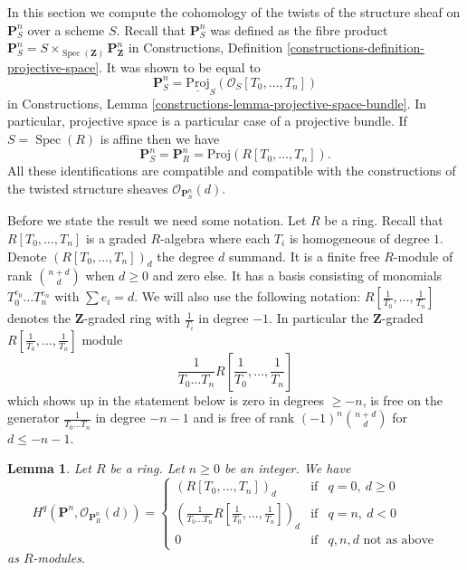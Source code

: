 \documentclass{stacks-project}
\newenvironment{reference}{\comment}{\endcomment}
\theoremstyle{plain}
\newtheorem{lemma}[subsection]{Lemma}
\theoremstyle{definition}
\theoremstyle{remark}
\numberwithin{equation}{subsection}
\def\Spec{\mathop{\mathrm{Spec}}}
\begin{document}
\noindent
In this section we compute the cohomology of the twists of the
structure sheaf on $\mathbf{P}^n_S$ over a scheme $S$.
Recall that $\mathbf{P}^n_S$ was defined as the fibre product
$
\mathbf{P}^n_S = S \times_{\Spec(\mathbf{Z})} \mathbf{P}^n_{\mathbf{Z}}
$
in Constructions, Definition \ref{constructions-definition-projective-space}.
It was shown to be equal to
$$
\mathbf{P}^n_S = \underline{\text{Proj}}_S(\mathcal{O}_S[T_0, \ldots, T_n])
$$
in Constructions, Lemma \ref{constructions-lemma-projective-space-bundle}.
In particular, projective space is a particular case of a projective bundle.
If $S = \Spec(R)$ is affine then we have
$$
\mathbf{P}^n_S = \mathbf{P}^n_R = \text{Proj}(R[T_0, \ldots, T_n]).
$$
All these identifications are compatible and compatible with the constructions
of the twisted structure sheaves $\mathcal{O}_{\mathbf{P}^n_S}(d)$.

\medskip\noindent
Before we state the result we need some notation.
Let $R$ be a ring.
Recall that $R[T_0, \ldots, T_n]$ is a graded
$R$-algebra where each $T_i$ is homogeneous of degree $1$.
Denote $(R[T_0, \ldots, T_n])_d$ the degree $d$ summand.
It is a finite free $R$-module of rank $\binom{n + d}{d}$
when $d \geq 0$ and zero else.
It has a basis consisting of monomials $T_0^{e_0} \ldots T_n^{e_n}$
with $\sum e_i = d$. We will also use the following notation:
$R[\frac{1}{T_0}, \ldots, \frac{1}{T_n}]$ denotes the $\mathbf{Z}$-graded
ring with $\frac{1}{T_i}$ in degree $-1$. In particular the
$\mathbf{Z}$-graded $R[\frac{1}{T_0}, \ldots, \frac{1}{T_n}]$ module
$$
\frac{1}{T_0 \ldots T_n} R[\frac{1}{T_0}, \ldots, \frac{1}{T_n}]
$$
which shows up in the statement below is zero in degrees
$\geq -n$, is free on the generator $\frac{1}{T_0 \ldots T_n}$
in degree $-n - 1$ and is free of rank $(-1)^n\binom{n + d}{d}$ for
$d \leq -n - 1$.

\begin{lemma}
\label{lemma-cohomology-projective-space-over-ring}
\begin{reference}
\cite[III Proposition 2.1.12]{EGA}
\end{reference}
Let $R$ be a ring.
Let $n \geq 0$ be an integer.
We have
$$
H^q(\mathbf{P}^n, \mathcal{O}_{\mathbf{P}^n_R}(d)) =
\left\{
\begin{matrix}
(R[T_0, \ldots, T_n])_d & \text{if} & q = 0,\ d \geq 0 \\
\left(\frac{1}{T_0 \ldots T_n} R[\frac{1}{T_0}, \ldots, \frac{1}{T_n}]\right)_d
& \text{if} & q = n,\ d < 0 \\
0 & \text{if} & q, n, d\text{ not as above}
\end{matrix}
\right.
$$
as $R$-modules.
\end{lemma}
\end{document}

